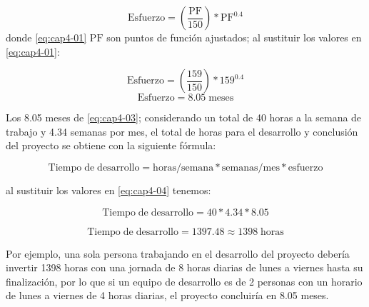 \begin{equation} \label{eq:cap4-01}
	\mathrm{Esfuerzo} = (\frac{\mathrm{PF}}{150})*\mathrm{PF}^{0.4}
\end{equation}
donde \eqref{eq:cap4-01} $\mathrm{PF}$ son puntos de función ajustados; al sustituir los valores en \eqref{eq:cap4-01}:

\begin{equation} \label{eq:cap4-02}
	\mathrm{Esfuerzo} = (\frac{159}{150})*159^{0.4}
\end{equation}
\begin{equation} \label{eq:cap4-03}
	\mathrm{Esfuerzo} = 8.05 \; \mathrm{meses}
\end{equation}




Los 8.05 meses de \eqref{eq:cap4-03}; considerando un total de 40 horas a la semana de trabajo y 4.34 semanas por mes, el total de horas para el desarrollo y conclusión del proyecto se obtiene con la siguiente fórmula:

\begin{equation} \label{eq:cap4-04}
	\mathrm{Tiempo\; de\; desarrollo} =  \mathrm{horas/semana} * \mathrm{semanas/mes} * \mathrm{esfuerzo}
\end{equation}

al sustituir los valores en \eqref{eq:cap4-04} tenemos:


\begin{equation} \label{eq:cap4-05}
	\mathrm{Tiempo\; de\; desarrollo} =  40 * 4.34 * 8.05
\end{equation}

\begin{equation} \label{eq:cap4-05}
	\mathrm{Tiempo\; de\; desarrollo} =  1397.48 \approx 1398\;  \mathrm{horas}
\end{equation}





Por ejemplo, una sola persona trabajando en el desarrollo del proyecto debería invertir 1398 horas con una jornada de 8 horas diarias de lunes a viernes hasta su finalización, por lo que si un equipo de desarrollo es de 2 personas con un horario de lunes a viernes de 4 horas diarias, el proyecto concluiría en 8.05 meses.


